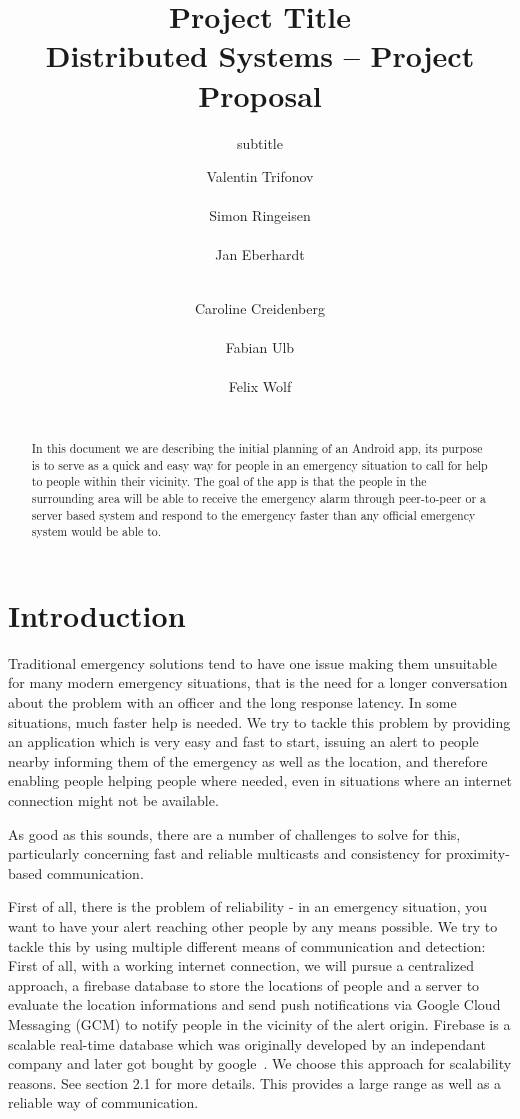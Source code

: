 \documentclass{report}
\title{Project Title\\
\normalsize{Distributed Systems -- Project Proposal}}
\subtitle{subtitle}
\author{
%
%
\alignauthor \normalsize{Valentin Trifonov}\\
	\affaddr{\normalsize{ETH ID 13-941-679}}\\
	\email{\normalsize{vatrifon@student.ethz.ch}}
\alignauthor \normalsize{Simon Ringeisen}\\
	\affaddr{\normalsize{ETH ID 13-934-930}}\\
	\email{\normalsize{rsimon@student.ethz.ch}}
\alignauthor \normalsize{Jan Eberhardt}\\
	\affaddr{\normalsize{ETH ID 13-925-417}}\\
	\email{\normalsize{ebjan@student.ethz.ch}}
\and
\alignauthor \normalsize{Caroline Creidenberg}\\
	\affaddr{\normalsize{ETH 15-907-421}}\\
	\email{\normalsize{ccreiden@student.ethz.ch}}
\alignauthor \normalsize{Fabian Ulb}\\
	\affaddr{\normalsize{ETH ID 13-931-951}}\\
	\email{\normalsize{fabianu@student.ethz.ch}}
\alignauthor \normalsize{Felix Wolf}\\
	\affaddr{\normalsize{ETH ID 13-927-983}}\\
	\email{\normalsize{fewolf@student.ethz.ch}}
}
\begin{document}
\maketitle

\begin{abstract}
In this document we are describing the initial planning of an Android app, its purpose is to serve as a quick and easy way for people in an emergency situation to call for help to people within their vicinity. The goal of the app is that the people in the surrounding area will be able to receive the emergency alarm through peer-to-peer or a server based system and respond to the emergency faster than any official emergency system would be able to. 
\end{abstract}

\section{Introduction}

Traditional emergency solutions tend to have one issue making them unsuitable for many modern emergency situations, that is the need for a longer conversation about the problem with an officer and the long response latency. In some situations, much faster help is needed.
We try to tackle this problem by providing an application which is very easy and fast to start, issuing an alert to people nearby informing them of the emergency as well as the location, and therefore enabling people helping people where needed, even in situations where an internet connection might not be available.

As good as this sounds, there are a number of challenges to solve for this, particularly concerning fast and reliable multicasts and consistency for proximity-based communication.

First of all, there is the problem of reliability - in an emergency situation, you want to have your alert reaching other people by any means possible. We try to tackle this by using multiple different means of communication and detection:
First of all, with a working internet connection, we will pursue a centralized approach, a firebase database to store the locations of people and a server to evaluate the location informations and send push notifications via Google Cloud Messaging (GCM) to notify people in the vicinity of the alert origin. Firebase is a scalable real-time database which was originally developed by an independant company and later got bought by google~\cite{firebase}. We choose this approach for scalability reasons. See section 2.1 for more details. This provides a large range as well as a reliable way of communication.
\end{document}
